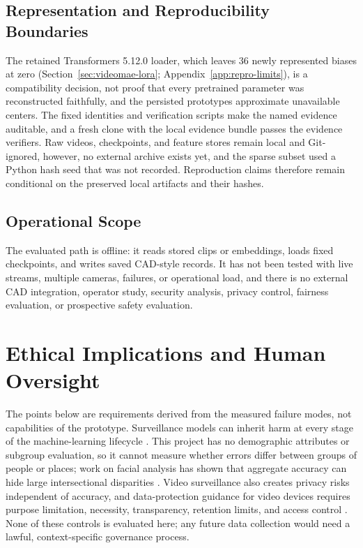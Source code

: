 \subsection{Representation and Reproducibility Boundaries}

The retained Transformers 5.12.0 loader, which leaves 36 newly represented
biases at zero (Section~\ref{sec:videomae-lora}; Appendix~\ref{app:repro-limits}),
is a compatibility decision, not proof that every pretrained parameter was
reconstructed faithfully, and the persisted  prototypes
approximate unavailable  centers. The fixed identities and
verification scripts make the named evidence auditable, and a fresh clone with
the local evidence bundle passes the evidence verifiers. Raw videos, checkpoints,
and feature stores remain local and Git-ignored, however, no external archive
exists yet, and the sparse subset used a Python hash seed that was not recorded.
Reproduction claims therefore remain conditional on the preserved local
artifacts and their hashes.

\subsection{Operational Scope}

The evaluated path is offline: it reads stored clips or embeddings, loads fixed
checkpoints, and writes saved CAD-style records. It has not been tested with live
streams, multiple cameras, failures, or operational load, and there is no
external CAD integration, operator study, security analysis, privacy control,
fairness evaluation, or prospective safety evaluation.

\section{Ethical Implications and Human Oversight}
\label{sec:discussion-ethics}

The points below are requirements derived from the measured failure modes, not
capabilities of the prototype. Surveillance models can inherit harm at every
stage of the machine-learning lifecycle \cite{suresh2021framework}. This project
has no demographic attributes or subgroup evaluation, so it cannot measure
whether errors differ between groups of people or places; work on facial
analysis has shown that aggregate accuracy can hide large intersectional
disparities \cite{buolamwini2018gender}. Video surveillance also creates privacy
risks independent of accuracy, and data-protection guidance for video devices
requires purpose limitation, necessity, transparency, retention limits, and
access control \cite{edpb2020video}. None of these controls is evaluated here;
any future data collection would need a lawful, context-specific governance
process.

